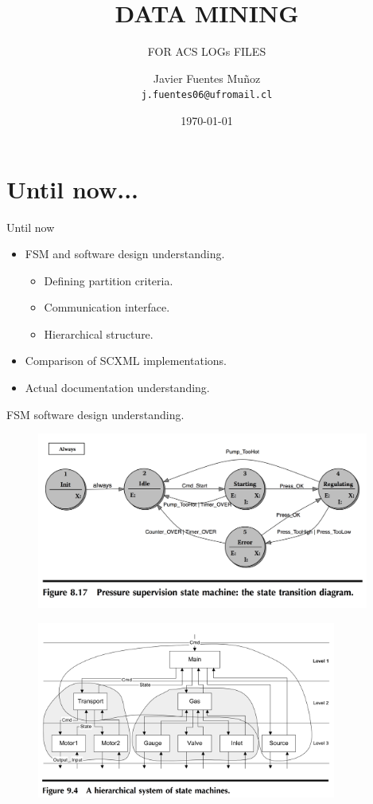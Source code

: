 \documentclass[11pt]{beamer}
\author{Javier Fuentes Muñoz \\ \texttt{j.fuentes06@ufromail.cl}}
\title{DATA MINING}
\subtitle{FOR ACS LOGs FILES}
\institute{University of La Frontera}
\date{\today}
\begin{document}
\begin{frame}
\titlepage
\end{frame}
\section{Until now...}
\begin{frame}{Until now}
	\begin{itemize}
		\item FSM and software design understanding.
		\begin{itemize}
			\item Defining partition criteria.
			\item Communication interface.
			\item Hierarchical structure.
		\end{itemize}
		\item Comparison of SCXML implementations.
		\item Actual documentation understanding.
	\end{itemize}
\end{frame}

\begin{frame}{FSM software design understanding.}
\begin{figure}
\centering
	\includegraphics[height=5.8cm]{min}
\end{figure}
\end{frame}

\begin{frame}
\begin{figure}
\centering
	\includegraphics[height=5.8cm]{complex.png}
\end{figure}
\end{frame}
\end{document}
